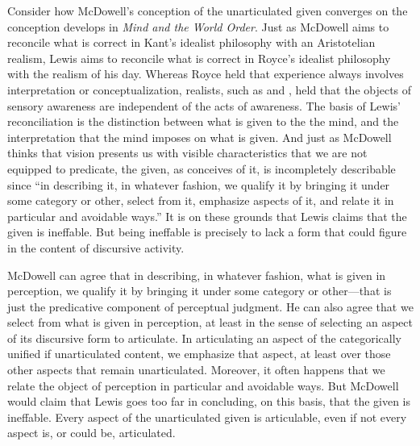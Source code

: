 \documentclass[12pt]{article}
\begin{document}
Consider how McDowell's conception of the unarticulated given converges on the conception \citet{Lewis:1929fk} develops in \emph{Mind and the World Order}. Just as McDowell aims to reconcile what is correct in Kant's idealist philosophy with an Aristotelian realism, Lewis aims to reconcile what is correct in Royce's idealist philosophy with the realism of his day. Whereas Royce held that experience always involves interpretation or conceptualization, realists, such as \citet{Russell:1912uq} and \citet{Moore:1903uo}, held that the objects of sensory awareness are independent of the acts of awareness. The basis of Lewis' reconciliation is the distinction between what is given to the the mind, and the interpretation that the mind imposes on what is given. And just as McDowell thinks that vision presents us with visible characteristics that we are not equipped to predicate, the given, as \citet[52]{Lewis:1929fk} conceives of it, is incompletely describable since ``in describing it, in whatever fashion, we qualify it by bringing it under some category or other, select from it, emphasize aspects of it, and relate it in particular and avoidable ways.'' It is on these grounds that Lewis claims that the given is ineffable. But being ineffable is precisely to lack a form that could figure in the content of discursive activity.

McDowell can agree that in describing, in whatever fashion, what is given in perception, we qualify it by bringing it under some category or other---that is just the predicative component of perceptual judgment. He can also agree that we select from what is given in perception, at least in the sense of selecting an aspect of its discursive form to articulate. In articulating an aspect of the categorically unified if unarticulated content, we emphasize that aspect, at least over those other aspects that remain unarticulated. Moreover, it often happens that we  relate the object of perception in particular and avoidable ways. But McDowell would claim that Lewis goes too far in concluding, on this basis, that the given is ineffable. Every aspect of the unarticulated given is articulable, even if not every aspect is, or could be, articulated.
\end{document}
